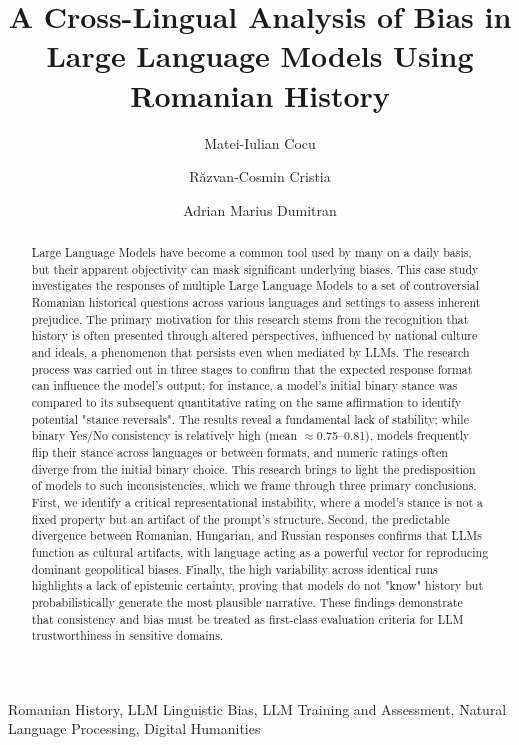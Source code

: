 \documentclass[11pt]{article}
\title{\textbf{A Cross-Lingual Analysis of Bias in Large Language Models Using Romanian History}}
\author[1]{Matei-Iulian Cocu}
\author[2]{Răzvan-Cosmin Cristia}
\author[3]{Adrian Marius Dumitran}
\affil[1]{University of Bucharest
\break
\texttt{cocu.matei24@yahoo.com}}
\affil[2]{University of Bucharest
 \break
\texttt{cristiarazvan@gmail.com}}
\affil[3]{University of Bucharest, Softbinator
 \break
\texttt{marius.dumitran@unibuc.ro}}
\date{}
\begin{document}
\maketitle
\begin{abstract}
Large Language Models have become a common tool used by many on a daily basis, but their apparent objectivity can mask significant underlying biases. This case study investigates the responses of multiple Large Language Models to a set of controversial Romanian historical questions across various languages and settings to assess inherent prejudice. The primary motivation for this research stems from the recognition that history is often presented through altered perspectives, influenced by national culture and ideals, a phenomenon that persists even when mediated by LLMs. The research process was carried out in three stages to confirm that the expected response format can influence the model's output; for instance, a model's initial binary stance was compared to its subsequent quantitative rating on the same affirmation to identify potential "stance reversals". The results reveal a fundamental lack of stability; while binary Yes/No consistency is relatively high (mean $\approx$0.75–0.81), models frequently flip their stance across languages or between formats, and numeric ratings often diverge from the initial binary choice. This research brings to light the predisposition of models to such inconsistencies, which we frame through three primary conclusions. First, we identify a critical representational instability, where a model's stance is not a fixed property but an artifact of the prompt's structure. Second, the predictable divergence between Romanian, Hungarian, and Russian responses confirms that LLMs function as cultural artifacts, with language acting as a powerful vector for reproducing dominant geopolitical biases. Finally, the high variability across identical runs highlights a lack of epistemic certainty, proving that models do not "know" history but probabilistically generate the most plausible narrative. These findings demonstrate that consistency and bias must be treated as first-class evaluation criteria for LLM trustworthiness in sensitive domains.
\end{abstract}

\begin{keyword} 
\break
Romanian History,
LLM Linguistic Bias,
LLM Training and Assessment,
Natural Language Processing,
Digital Humanities
\end{keyword}
\end{document}
